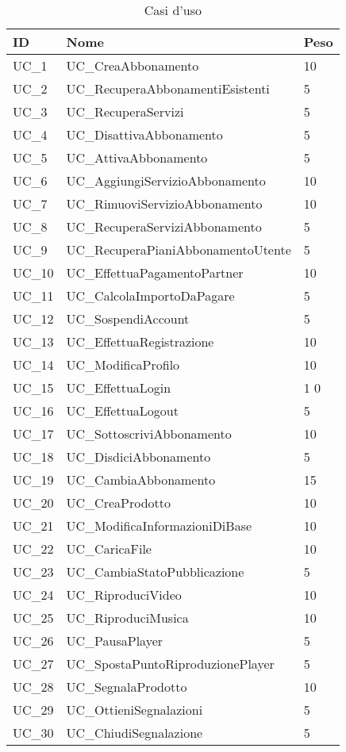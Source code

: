 \clearpage
\begin{longtable}{| p{} | p{} | p{} |} 
\caption{Casi d'uso}\\
\hline
\textbf{ID} & \textbf{Nome} & \textbf{Peso} \\\hline
UC\_1 & UC\_CreaAbbonamento & 10\\
UC\_2 & UC\_RecuperaAbbonamentiEsistenti & 5\\
UC\_3 & UC\_RecuperaServizi & 5\\
UC\_4 & UC\_DisattivaAbbonamento & 5\\
UC\_5 & UC\_AttivaAbbonamento & 5\\
UC\_6 & UC\_AggiungiServizioAbbonamento & 10\\
UC\_7 & UC\_RimuoviServizioAbbonamento & 10\\
UC\_8 & UC\_RecuperaServiziAbbonamento & 5\\
UC\_9 & UC\_RecuperaPianiAbbonamentoUtente & 5\\
UC\_10 & UC\_EffettuaPagamentoPartner & 10\\
UC\_11 & UC\_CalcolaImportoDaPagare & 5\\
UC\_12 & UC\_SospendiAccount & 5\\
UC\_13 & UC\_EffettuaRegistrazione & 10\\
UC\_14 & UC\_ModificaProfilo & 10\\
UC\_15 & UC\_EffettuaLogin &1 0\\
UC\_16 & UC\_EffettuaLogout & 5\\
UC\_17 & UC\_SottoscriviAbbonamento & 10\\
UC\_18 & UC\_DisdiciAbbonamento & 5\\
UC\_19 & UC\_CambiaAbbonamento & 15\\
UC\_20 & UC\_CreaProdotto & 10\\
UC\_21 & UC\_ModificaInformazioniDiBase & 10\\
UC\_22 & UC\_CaricaFile & 10\\
UC\_23 & UC\_CambiaStatoPubblicazione & 5\\
UC\_24 & UC\_RiproduciVideo & 10\\
UC\_25 & UC\_RiproduciMusica & 10\\
UC\_26 & UC\_PausaPlayer & 5\\
UC\_27 & UC\_SpostaPuntoRiproduzionePlayer & 5\\
UC\_28 & UC\_SegnalaProdotto & 10\\
UC\_29 & UC\_OttieniSegnalazioni & 5\\
UC\_30 & UC\_ChiudiSegnalazione & 5\\

\end{longtable}
